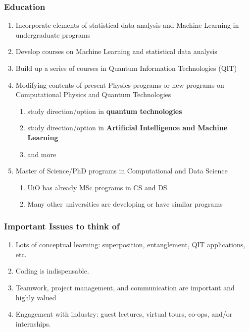 \documentclass{beamer}
\begin{document}
\begin{frame}
\frametitle{Education}

\begin{enumerate}
\item Incorporate elements of statistical data analysis and Machine Learning in undergraduate programs

\item Develop courses on Machine Learning and statistical data analysis

\item Build up a series of courses in Quantum Information Technologies (QIT)

\item Modifying contents of present Physics programs or new programs on  Computational Physics and Quantum Technologies
\begin{enumerate}

 \item study direction/option in \textbf{quantum technologies}

 \item study direction/option in \textbf{Artificial Intelligence and Machine Learning}

 \item and more

\end{enumerate}

\noindent
\item Master of Science/PhD programs in Computational and Data Science
\begin{enumerate}

 \item UiO has already MSc programs in CS and DS

 \item Many other universities are developing or have similar programs
\end{enumerate}

\noindent
\end{enumerate}

\noindent
\end{frame}

\begin{frame}
\frametitle{Important Issues to think of}

\begin{enumerate}
\item Lots of conceptual learning: superposition, entanglement, QIT applications, etc.

\item Coding is indispensable. 

\item Teamwork, project management, and communication are important and highly valued

\item Engagement with industry: guest lectures, virtual tours, co-ops, and/or internships.
\end{enumerate}

\noindent
\end{frame}
\end{document}
